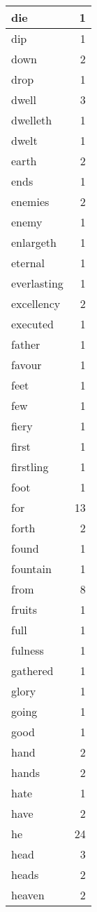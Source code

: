 \begin{center}
\begin{longtable}{l|r}
die & 1 \\ \hline
dip & 1 \\ \hline
down & 2 \\ \hline
drop & 1 \\ \hline
dwell & 3 \\ \hline
dwelleth & 1 \\ \hline
dwelt & 1 \\ \hline
earth & 2 \\ \hline
ends & 1 \\ \hline
enemies & 2 \\ \hline
enemy & 1 \\ \hline
enlargeth & 1 \\ \hline
eternal & 1 \\ \hline
everlasting & 1 \\ \hline
excellency & 2 \\ \hline
executed & 1 \\ \hline
father & 1 \\ \hline
favour & 1 \\ \hline
feet & 1 \\ \hline
few & 1 \\ \hline
fiery & 1 \\ \hline
first & 1 \\ \hline
firstling & 1 \\ \hline
foot & 1 \\ \hline
for & 13 \\ \hline
forth & 2 \\ \hline
found & 1 \\ \hline
fountain & 1 \\ \hline
from & 8 \\ \hline
fruits & 1 \\ \hline
full & 1 \\ \hline
fulness & 1 \\ \hline
gathered & 1 \\ \hline
glory & 1 \\ \hline
going & 1 \\ \hline
good & 1 \\ \hline
hand & 2 \\ \hline
hands & 2 \\ \hline
hate & 1 \\ \hline
have & 2 \\ \hline
he & 24 \\ \hline
head & 3 \\ \hline
heads & 2 \\ \hline
heaven & 2 \\ \hline

\end{longtable}
\end{center}
